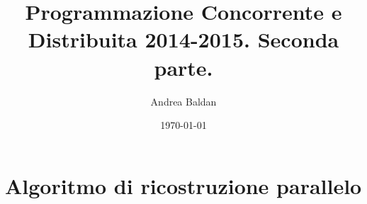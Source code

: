 \documentclass[11pt,a4paper]{article}
\author{Andrea Baldan}
\date{\today}
\title{Programmazione Concorrente e Distribuita 2014-2015. Seconda parte.}
\begin{document}
\maketitle
\tableofcontents

\section{Algoritmo di ricostruzione parallelo}
\label{sec-1}
\end{document}
